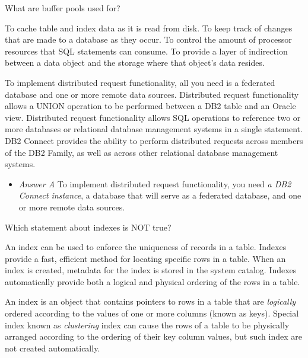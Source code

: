 \documentclass[answers, 11pt]{exam}
\begin{document}
\begin{questions}
\question[1]
What are buffer pools used for?
\begin{choices}
	\CorrectChoice To cache table and index data as it is read from disk.
	\choice To keep track of changes that are made to a database as they occur.
	\choice To control the amount of processor resources that SQL statements can consume.
	\choice To provide a layer of indirection between a data object and the storage where that object's data
	resides.
\end{choices}

\begin{choices}
	\CorrectChoice To implement distributed request functionality, all you need is a federated database and one
	or more remote data sources.
	\choice Distributed request functionality allows a UNION operation to be performed between a DB2 table and
	an Oracle view.
	\choice Distributed request functionality allows SQL operations to reference two or more databases or 
	relational database management systems in a single statement.
	\choice DB2 Connect provides the ability to perform distributed requests across members of the DB2 Family,
	as well as across other relational database management systems.
\end{choices}

\begin{solution}
	\begin{itemize}
		\item \textit{Answer A} To implement distributed request functionality, you need \textit{a DB2 Connect instance},
		a database that will serve as a federated database, and one or more remote data sources.
	\end{itemize}
\end{solution}

\question[1]
Which statement about indexes is NOT true?
\begin{choices}
	\choice An index can be used to enforce the uniqueness of records in a table.
	\choice Indexes provide a fast, efficient method for locating specific rows in a table.
	\choice When an index is created, metadata for the index is stored in the system catalog.
	\CorrectChoice Indexes automatically provide both a logical and physical ordering of the rows in a table.
\end{choices}

\begin{solution}
	An index is an object that contains pointers to rows in a table that are \textit{logically} ordered according to the values
	of one or more columns (known as keys). Special index known as \textit{clustering} index can cause the rows of a table to be physically
	arranged according to the ordering of their key column values, but such index are not created automatically. 
\end{solution}


\end{questions}
\end{document}

